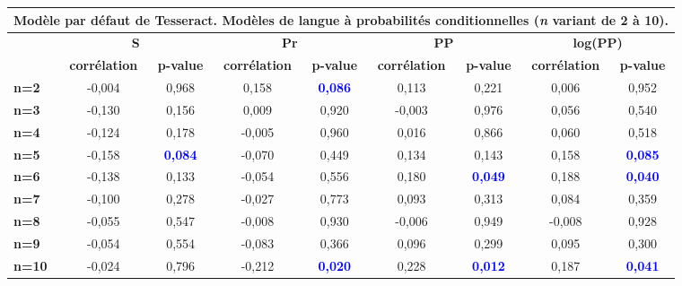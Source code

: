 \documentclass[10pt,twoside]{article}
\begin{document}
\begin{table}
\begin{center}
\begin{scriptsize}
    \begin{tabular}{|l|c|c|c|c|c|c|c|c|}
    \multicolumn{9}{c}{{\footnotesize Modèle par défaut de Tesseract. Modèles de langue à probabilités conditionnelles (\textit{n} variant de 2 à 10).}}\\\hline
    \multirow{2}{*}{\textbf{}} & \multicolumn{2}{c|}{\textbf{S}}         & \multicolumn{2}{c|}{\textbf{Pr}}        & \multicolumn{2}{c|}{\textbf{PP}}        & \multicolumn{2}{c|}{\textbf{log(PP)}}   \\ 
    \cline{2-9} & \textbf{corrélation} & \textbf{p-value} & \textbf{corrélation} & \textbf{p-value} & \textbf{corrélation} & \textbf{p-value} & \textbf{corrélation} & \textbf{p-value} \\ \hline
    
    \textbf{n=2}  & -0,004 & 0,968 & 0,158  & \textcolor{blue}{\textbf{0,086}}          & 0,113  & 0,221          & 0,006  & 0,952          \\ \hline
    \textbf{n=3}  & -0,130 & 0,156 & 0,009  & 0,920          & -0,003 & 0,976          & 0,056  & 0,540          \\ \hline
    \textbf{n=4}  & -0,124 & 0,178 & -0,005 & 0,960          & 0,016  & 0,866          & 0,060  & 0,518          \\ \hline
    \textbf{n=5}  & -0,158 & \textcolor{blue}{\textbf{0,084}} & -0,070 & 0,449          & 0,134  & 0,143          & 0,158  & \textcolor{blue}{\textbf{0,085}}          \\ \hline
    \textbf{n=6}  & -0,138 & 0,133 & -0,054 & 0,556          & 0,180  & \textcolor{blue}{\textbf{0,049}} & 0,188  & \textcolor{blue}{\textbf{0,040}} \\ \hline
    \textbf{n=7}  & -0,100 & 0,278 & -0,027 & 0,773          & 0,093  & 0,313          & 0,084  & 0,359          \\ \hline
    \textbf{n=8}  & -0,055 & 0,547 & -0,008 & 0,930          & -0,006 & 0,949          & -0,008 & 0,928          \\ \hline
    \textbf{n=9}  & -0,054 & 0,554 & -0,083 & 0,366          & 0,096  & 0,299          & 0,095  & 0,300          \\ \hline
    \textbf{n=10} & -0,024 & 0,796 & -0,212 & \textcolor{blue}{\textbf{0,020}} & 0,228  & \textcolor{blue}{\textbf{0,012}} & 0,187  & \textcolor{blue}{\textbf{0,041}} \\ \hline
    
    \end{tabular}
    \begin{tabular}{|l|c|c|c|c|c|c|c|c|}


\end{tabular}
\end{scriptsize}
\end{center}
\end{table}
\end{document}

